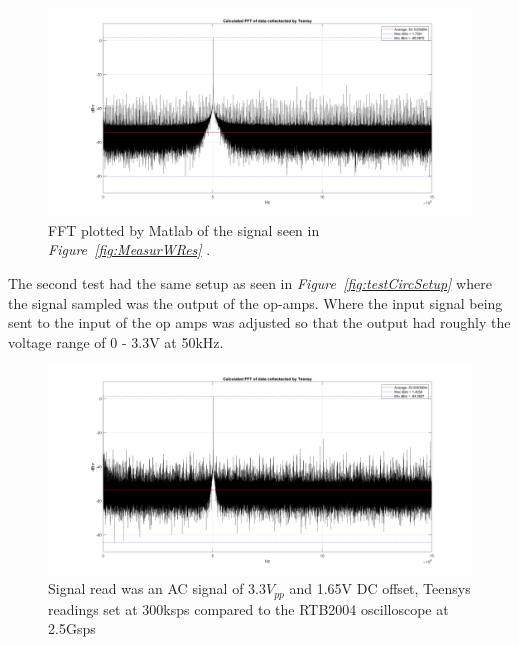 \vspace{8cm}

\begin{figure}[h]
    \centering
    \includegraphics[width=1.0\textwidth]{graphics/FFTWRes.png}
    \caption{FFT plotted by Matlab of the signal seen in \textit{Figure~\ref{fig:MeasurWRes} }.}
    \label{fig:FFTWRes}
\end{figure}

The second test had the same setup as seen in \textit{Figure~\ref{fig:testCircSetup}} where the signal sampled was the output of the op-amps.
Where the input signal being sent to the input of the op amps was adjusted so that the output had roughly the voltage range of 0 - 3.3V at 50kHz.

\begin{figure}[h]
    \centering
    \includegraphics[width=1.0\textwidth]{graphics/FFTWResOpamp.png}
    \caption{Signal read was an AC signal of 3.3$V_{pp}$ and 1.65V DC offset, Teensys readings set at 300ksps compared to the RTB2004 oscilloscope at 2.5Gsps}
    \label{fig:FFTWResOpamp}
\end{figure}

